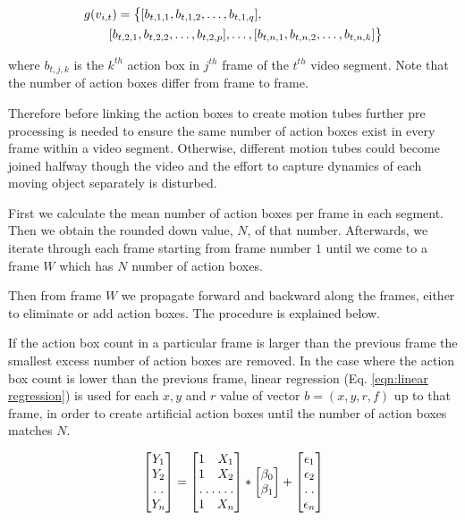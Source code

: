 \begin{equation}
\label{eqn:action box}
\begin{split}
\MoveEqLeft
 g(v_{i,t}) = \big\{[b_{t,1,1},b_{t,1,2},\dots,b_{t,1,q}],\\
 & [b_{t,2,1},b_{t,2,2},\dots,b_{t,2,p}],\dots,[b_{t,n,1},b_{t,n,2},\dots,b_{t,n,k}]\big\}
\end{split}
\end{equation}

where $b_{t,j,k}$ is the $k^{th}$ action box in $j^{th}$ frame of the $t^{th}$ video segment. Note that the number of
action boxes differ from frame to frame.

Therefore before linking the action boxes to create motion tubes further pre processing is needed to ensure the same number of action
boxes exist in every frame within a video segment. Otherwise, different motion tubes could become joined halfway though the video and the
effort to capture dynamics of each moving object separately is disturbed.

First we calculate the mean number of action boxes per frame in each segment. Then we obtain the rounded down value, $N$, of that number.
Afterwards, we iterate through each frame starting from frame number $1$ until we come to a frame $W$ which has $N$ number of action boxes.

Then from frame $W$ we propagate forward and backward along the frames, either to eliminate or add action boxes. The procedure is explained below.

If the action box count in a particular frame is larger than the previous frame the smallest excess number of action boxes are removed.
In the case where the action box count is lower than the previous frame, linear regression (Eq. \ref{eqn:linear regression}) is used for each $x,y$ and $r$ value of vector $b = (x,y,r,f)$
up to that frame, in order to create artificial action boxes until the number of action boxes matches $N$.

\begin{equation}
\label{eqn:linear regression}
\begin{bmatrix}
    Y_{1}     \\
    Y_{2}     \\
    \hdotsfor{1} \\
    Y_{n}
\end{bmatrix}
=
\begin{bmatrix}
    1 & X_{1}     \\
    1 & X_{2}     \\
    \hdotsfor{2} \\
    1 & X_{n}
\end{bmatrix}
*
\begin{bmatrix}
    \beta_{0}     \\
    \beta_{1}
\end{bmatrix}
+
\begin{bmatrix}
    \epsilon_{1}     \\
    \epsilon_{2}    \\
    \hdotsfor{1} \\
    \epsilon_{n}
\end{bmatrix}
\end{equation}

